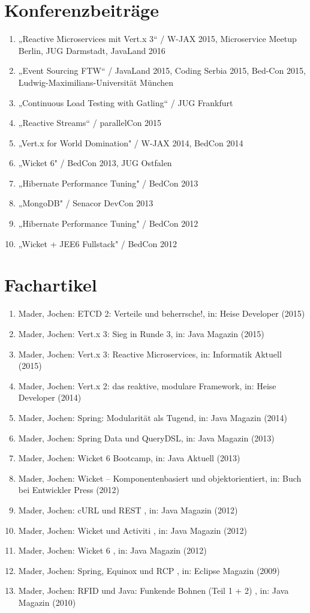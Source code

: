 \section*{Konferenzbeiträge}
\begin{enumerate}[label=,leftmargin=0cm,itemsep=10pt]
\item „Reactive Microservices mit Vert.x 3“ / W-JAX 2015, Microservice Meetup Berlin, JUG Darmstadt, JavaLand 2016
\item „Event Sourcing FTW“ / JavaLand 2015, Coding Serbia 2015, Bed-Con 2015, Ludwig-Maximilians-Universität München
\item „Continuous Load Testing with Gatling“ / JUG Frankfurt
\item „Reactive Streams“ / parallelCon 2015
\item „Vert.x for World Domination" / W-JAX 2014, BedCon 2014
\item „Wicket 6" / BedCon 2013, JUG Ostfalen
\item „Hibernate Performance Tuning" / BedCon 2013
\item „MongoDB" / Senacor DevCon 2013
\item „Hibernate Performance Tuning" / BedCon 2012
\item „Wicket + JEE6 Fullstack" / BedCon 2012
\end{enumerate}

\section*{Fachartikel}
\begin{enumerate}[label=,leftmargin=0cm,itemsep=10pt]
\item Mader, Jochen: ETCD 2: Verteile und beherrsche!, in: Heise Developer (2015)
\item Mader, Jochen: Vert.x 3: Sieg in Runde 3, in: Java Magazin (2015)
\item Mader, Jochen: Vert.x 3: Reactive Microservices, in: Informatik Aktuell (2015)
\item Mader, Jochen: Vert.x 2: das reaktive, modulare Framework, in: Heise Developer (2014)
\item Mader, Jochen: Spring: Modularität als Tugend, in: Java Magazin (2014)
\item Mader, Jochen: Spring Data und QueryDSL, in: Java Magazin (2013)
\item Mader, Jochen: Wicket 6 Bootcamp, in: Java Aktuell (2013)
\item Mader, Jochen: Wicket – Komponentenbasiert und objektorientiert, in: Buch bei Entwickler Press (2012)
\item Mader, Jochen: cURL und REST , in: Java Magazin (2012)
\item Mader, Jochen: Wicket und Activiti , in: Java Magazin (2012)
\item Mader, Jochen: Wicket 6 , in: Java Magazin (2012)
\item Mader, Jochen: Spring, Equinox und RCP , in: Eclipse Magazin (2009)
\item Mader, Jochen: RFID und Java: Funkende Bohnen (Teil 1 + 2) , in: Java Magazin (2010)
\end{enumerate}

